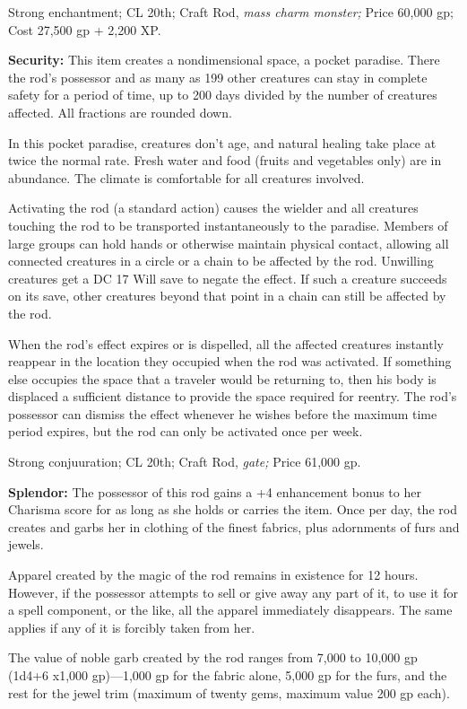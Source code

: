\documentclass{article}
\begin{document}
Strong enchantment; CL 20th; Craft Rod, \textit{mass charm monster; }Price 60,000 
gp; Cost 27,500 gp + 2,200 XP.

\textbf{Security: }This item creates a nondimensional space, a pocket paradise. 
There the rod's possessor and as many as 199 other creatures can stay in complete 
safety for a period of time, up to 200 days divided by the number of creatures 
affected. All fractions are rounded down.

In this pocket paradise, creatures don't age, and natural healing take place at 
twice the normal rate. Fresh water and food (fruits and vegetables only) are in 
abundance. The climate is comfortable for all creatures involved.

Activating the rod (a standard action) causes the wielder and all creatures touching 
the rod to be transported instantaneously to the paradise. Members of large groups 
can hold hands or otherwise maintain physical contact, allowing all connected creatures 
in a circle or a chain to be affected by the rod. Unwilling creatures get a DC 
17 Will save to negate the effect. If such a creature succeeds on its save, other 
creatures beyond that point in a chain can still be affected by the rod.

When the rod's effect expires or is dispelled, all the affected creatures instantly 
reappear in the location they occupied when the rod was activated. If something 
else occupies the space that a traveler would be returning to, then his body is 
displaced a sufficient distance to provide the space required for reentry. The 
rod's possessor can dismiss the effect whenever he wishes before the maximum time 
period expires, but the rod can only be activated once per week.

Strong conjuuration; CL 20th; Craft Rod, \textit{gate; }Price 61,000 gp.

\textbf{Splendor: }The possessor of this rod gains a +4 enhancement bonus to her 
Charisma score for as long as she holds or carries the item. Once per day, the 
rod creates and garbs her in clothing of the finest fabrics, plus adornments of 
furs and jewels. 

Apparel created by the magic of the rod remains in existence for 12 hours. However, 
if the possessor attempts to sell or give away any part of it, to use it for a 
spell component, or the like, all the apparel immediately disappears. The same 
applies if any of it is forcibly taken from her.

The value of noble garb created by the rod ranges from 7,000 to 10,000 gp (1d4+6 
x$ $1,000 gp)---1,000 gp for the fabric alone, 5,000 gp for the furs, and the rest 
for the jewel trim (maximum of twenty gems, maximum value 200 gp each).
\end{document}
